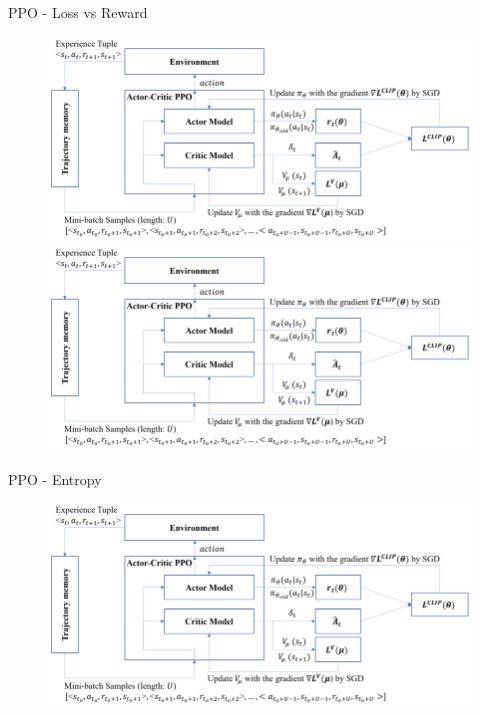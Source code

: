 \documentclass[serif]{beamer}  %
\begin{document}
\begin{frame}{PPO - Loss vs Reward}
    \begin{figure}
        \centering
        \includegraphics[width=\linewidth]{images/PPO_diagram.png}
        \includegraphics[width=\linewidth]{images/PPO_diagram.png}
    \end{figure}
\end{frame}

\begin{frame}{PPO - Entropy}
    \begin{figure}
        \centering
        \includegraphics[width=\linewidth]{images/PPO_diagram.png}
    \end{figure}
\end{frame}
\end{document}
